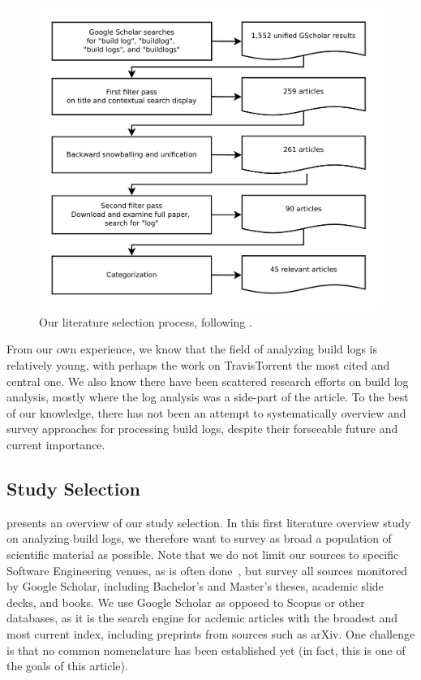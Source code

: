 \begin{figure}[htb]
	\centering
	\includegraphics[width=\columnwidth, clip]{img/lit_survey.pdf}
	\caption{Our literature selection process, following
	\cite{petersen2015guidelines}.}
	\label{fig:lit-survey}
\end{figure}

From our own experience, we know that the field of analyzing build
logs is relatively young, with perhaps the work on TravisTorrent the
most cited and central one.
We also know there have been scattered
research efforts on build log analysis, mostly where the
log analysis was a side-part of the article.
To the best of our
knowledge, there has not been an attempt to systematically overview
and survey approaches for processing build logs,
despite their forseeable future and current importance.

\subsection{Study Selection}
 presents an overview of our study selection.
In this first literature overview study on analyzing build logs, we
therefore want to survey as broad a population of scientific material
as possible.
Note that we do not limit our sources to specific
Software Engineering venues, as is often
done~\cite{petersen2015guidelines}, but survey all sources
monitored by Google Scholar, including Bachelor's and Master's theses,
academic slide decks, and books.
We use Google Scholar as opposed to
Scopus or other databases, as it is the search engine for acdemic
articles with the broadest and most current index, including preprints
from sources such as arXiv.
One challenge is that no common
nomenclature has been established yet (in fact, this is one of the
goals of this article).

